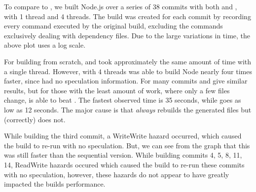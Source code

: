 


\vspace{3mm}

To compare to \Rattle, we built Node.js over a series of 38 commits with both \Make and \Rattle, with 1 thread and 4 threads. The \Rattle build was created for each commit by recording every command executed by the original build, excluding the commands exclusively dealing with dependency files. Due to the large variations in time, the above plot uses a log scale.

For building from scratch, \Make and \Rattle took approximately the same amount of time with a single thread. However, with 4 threads \Make was able to build Node nearly four times faster, since \Rattle had no speculation information. For many commits \Rattle and \Make give similar results, but for those with the least amount of work, where only a few files change, \Rattle is able to beat \Make. The fastest observed \Make time is 35 seconds, while \Rattle goes as low as 12 seconds. The major cause is that \Make \emph{always} rebuilds the generated files but \Rattle (correctly) does not.

While building the third commit, a WriteWrite hazard occurred, which caused the build to re-run
with no speculation.  But, we can see from the graph that this was still faster than the sequential
version.  While building commits 4, 5, 8, 11, 14, ReadWrite hazards occured which caused the
build to re-run these commits with no speculation, however, these hazards do not appear to have greatly impacted the builds performance.

